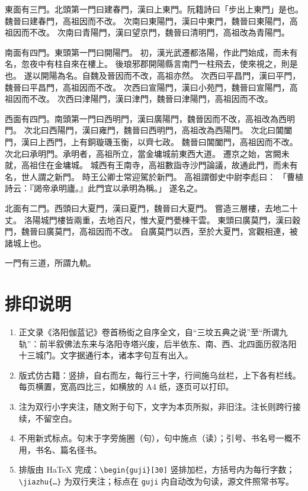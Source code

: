 \begin{guji}[30]
東面有三門。北頭第一門曰建春門，漢曰上東門。阮籍詩曰「步出上東門」是也。
魏晉曰建春門，高祖因而不改。
次南曰東陽門，漢曰中東門，魏晉曰東陽門，高祖因而不改。
次南曰青陽門，漢曰望京門，魏晉曰清明門，高祖改為青陽門。

南面有四門。東頭第一門曰開陽門。
初，漢光武遷都洛陽，作此門始成，而未有名，忽夜中有柱自來在樓上。
後琅邪郡開陽縣言南門一柱飛去，使來視之，則是也。
遂以開陽為名。自魏及晉因而不改，高祖亦然。
次西曰平昌門，漢曰平門，魏晉曰平昌門，高祖因而不改。
次西曰宣陽門，漢曰小苑門，魏晉曰宣陽門，高祖因而不改。
次西曰津陽門，漢曰津門，魏晉曰津陽門，高祖因而不改。

西面有四門。南頭第一門曰西明門，漢曰廣陽門，魏晉因而不改，高祖改為西明門。
次北曰西陽門，漢曰雍門，魏晉曰西明門，高祖改為西陽門。
次北曰閶闔門，漢曰上西門，上有銅璇璣玉衡，以齊七政。
魏晉曰閶闔門，高祖因而不改。
次北曰承明門。承明者，高祖所立，當金墉城前東西大道。
遷京之始，宮闕未就，高祖住在金墉城。
城西有王南寺，高祖數詣寺沙門論議，故通此門，而未有名，世人謂之新門。
時王公卿士常迎駕於新門。
高祖謂御史中尉李彪曰：
「曹植詩云：『謁帝承明廬。』此門宜以承明為稱。」
遂名之。

北面有二門。西頭曰大夏門，漢曰夏門，魏晉曰大夏門。
嘗造三層樓，去地二十丈。
洛陽城門樓皆兩重，去地百尺，惟大夏門甍棟干雲。
東頭曰廣莫門，漢曰穀門，魏晉曰廣莫門，高祖因而不改。
自廣莫門以西，至於大夏門，宮觀相連，被諸城上也。

一門有三道，所謂九軌。
\end{guji}

\section*{排印说明}
\begin{enumerate}
  \item 正文录《洛阳伽蓝记》卷首杨衒之自序全文，自“三坟五典之说”至“所谓九轨”：前半叙佛法东来与洛阳寺塔兴废，后半依东、南、西、北四面历叙洛阳十三城门。文字据通行本，诸本字句互有出入。
  \item 版式仿古籍：竖排，自右而左，每行三十字，行间施乌丝栏，上下各有栏线。每页横置，宽高四比三，如横放的 A4 纸，逐页可以打印。
  \item 注为双行小字夹注，随文附于句下，文字为本页所拟，非旧注。注长则跨行接续，不留空白。
  \item 不用新式标点。句末于字旁施圈（句），句中施点（读）；引号、书名号一概不用，书名、篇名径书。
  \item 排版由 HaTeX 完成：\verb|\begin{guji}[30]| 竖排加栏，方括号内为每行字数；\verb|\jiazhu{…}| 为双行夹注；标点在 \texttt{guji} 内自动改为句读，源文件照常书写。
\end{enumerate}
